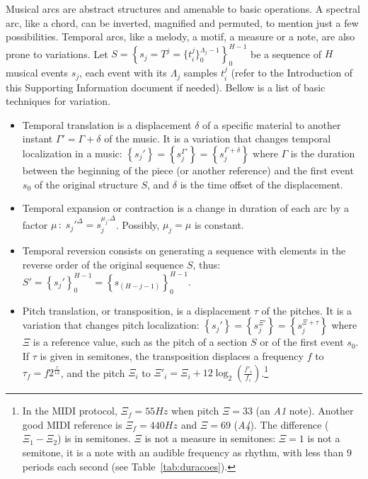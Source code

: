 \documentclass[format=acmsmall, review=false, screen=true]{acmart}
\begin{document}
Musical arcs are abstract structures and amenable to basic operations. A spectral arc, like a chord, can be inverted, magnified and permuted, to mention just a few possibilities. Temporal arcs, like a melody, a motif, a measure or a note, are also
prone to variations. Let
$S=\left\{s_j=T^j=\{t_i^{j}\}_0^{\Lambda_j-1}\right\}_0^{H-1}$ be a sequence
of $H$ musical events $s_j$, each event with its $\Lambda_j$ samples $t_i^j$
(refer to the Introduction of this Supporting Information document if needed). Bellow is a list of basic techniques
for variation.
\begin{itemize}
        \item Temporal translation is a displacement
    $\delta$ of a specific material to another instant $\Gamma'=\Gamma + \delta$
    of the music. It is a variation that changes temporal localization in
    a music:
    $\left\{s_j'\right\}=\left\{s_j^{\Gamma'}\right\}=\left\{s_j^{\Gamma+\delta}\right\}$
    where $\Gamma$ is the duration between the beginning of the piece (or another reference)
        and the first event $s_0$ of the original structure $S$, and
    $\delta$ is the time offset of the displacement.

    \item Temporal expansion or contraction is a change in duration of each
    arc by a factor $\mu\,:\; s_j'^{\Delta}=s_j^{\mu_j . \Delta}$. Possibly,
    $\mu_j=\mu$ is constant.

    \item Temporal reversion consists on generating a sequence with elements
    in the reverse order of the original sequence $S$, thus: $S'=\left\{s_j'\right\}_0^{H-1}=\left\{s_{(H-j-1)}\right\}_0^{H-1}$.

    \item Pitch translation, or transposition, is a displacement $\tau$ of the pitches.
        It is a variation that changes pitch
        localization:
        $\left\{s_j'\right\}=\left\{s_j^{\Xi'}\right\}=\left\{s_j^{\Xi+\tau}\right\}$
        where $\Xi$ is a reference value, such as the pitch of a section $S$ or of the first event $s_0$.
        If $\tau$ is given in semitones, the transposition displaces a
        frequency $f$ to $\tau_f=f2^{\frac{\tau}{12}}$,
        and the pitch $\Xi_i$ to $\Xi'_i=\Xi_i +12
		\log_2\left(\frac{f'_i}{f_i}\right)$.\footnote{In the MIDI protocol, $\Xi_{f}=55Hz$ when pitch $\Xi=33$
	(an \textit{A1} note). Another good MIDI reference is $\Xi_{f}=440Hz$ and
		$\Xi=69$ (\textit{A4}). The difference ($\Xi_1 - \Xi_2$) is in semitones.
        $\Xi$ is not a measure in semitones: $\Xi=1$ is not a semitone, it is a note with an audible frequency as rhythm, with
		less than 9 periods each second (see Table~\ref{tab:duracoes}).}


\end{itemize}
\end{document}
